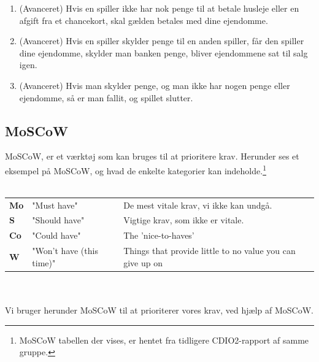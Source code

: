 \begin{enumerate}
\item (Avanceret) Hvis en spiller ikke har nok penge til at betale husleje eller en afgift fra et chancekort, skal gælden betales med dine ejendomme.
\item (Avanceret) Hvis en spiller skylder penge til en anden spiller, får den spiller dine ejendomme, skylder man banken penge, bliver ejendommene sat til salg igen.
\item (Avanceret) Hvis man skylder penge, og man ikke har nogen penge eller ejendomme, så er man fallit, og spillet slutter.
\end{enumerate}

\pagebreak

\subsection{MoSCoW}

MoSCoW, er et værktøj som kan bruges til at prioritere krav.
Herunder ses et eksempel på MoSCoW, og hvad de enkelte kategorier kan indeholde.\footnote{MoSCoW tabellen der vises, er hentet fra tidligere CDIO2-rapport af samme gruppe.} \\\\

\begin{tabular}{lll}
    \textbf{Mo} &   
    "Must have"                 &
    De mest vitale krav, vi ikke kan undgå. \\

    \textbf{S}  &   
    "Should have"               & 
    Vigtige krav, som ikke er vitale. \\

    \textbf{Co} &   
    "Could have"                & 
    The 'nice-to-haves' \\

    \textbf{W}  &   
    "Won’t have (this time)"    & 
    Things that provide little to no value you can give up on \\

\end{tabular}
\\\\

\noindent Vi bruger herunder MoSCoW til at prioriterer vores krav, ved hjælp af MoSCoW.

